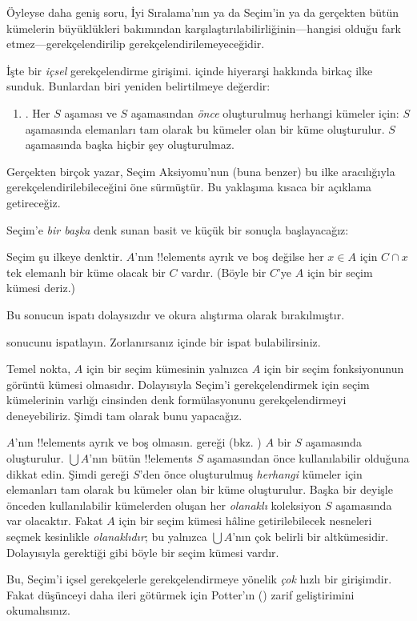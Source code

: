 


Öyleyse daha geniş soru, İyi Sıralama'nın ya da Seçim'in ya da gerçekten
bütün kümelerin büyüklükleri bakımından karşılaştırılabilirliğinin---hangisi
olduğu fark etmez---gerekçelendirilip gerekçelendirilemeyeceğidir.

İşte bir \emph{içsel} gerekçelendirme girişimi.
 içinde hiyerarşi hakkında birkaç ilke sunduk.
Bunlardan biri yeniden belirtilmeye değerdir:
\begin{enumerate}
	\item[] \stagesacc. Her $S$ aşaması ve $S$ aşamasından \emph{önce}
	oluşturulmuş herhangi kümeler için: $S$ aşamasında elemanları tam olarak
	bu kümeler olan bir küme oluşturulur. $S$ aşamasında başka hiçbir şey
	oluşturulmaz.
\end{enumerate}
Gerçekten birçok yazar, Seçim Aksiyomu'nun (buna benzer) bu ilke
aracılığıyla gerekçelendirilebileceğini öne sürmüştür. Bu yaklaşıma kısaca
bir açıklama getireceğiz.

Seçim'e \emph{bir başka} denk sunan basit ve küçük bir sonuçla başlayacağız:

\begin{thm}[$\ZF$ içinde]
Seçim şu ilkeye denktir. $A$'nın !!{element}s ayrık ve boş değilse her
$x\in A$ için $C\cap x$ tek elemanlı bir küme olacak bir $C$ vardır. (Böyle bir
$C$'ye $A$ için bir {seçim kümesi} deriz.)
\end{thm}

Bu sonucun ispatı dolaysızdır ve okura alıştırma olarak bırakılmıştır.

\begin{prob}
 sonucunu ispatlayın.
Zorlanırsanız \cite[pp.~242--3]{Potter2004} içinde bir ispat bulabilirsiniz.
\end{prob}

Temel nokta, $A$ için bir seçim kümesinin yalnızca $A$ için bir seçim
fonksiyonunun görüntü kümesi olmasıdır. Dolayısıyla Seçim'i gerekçelendirmek
için seçim kümelerinin varlığı cinsinden denk formülasyonunu
gerekçelendirmeyi deneyebiliriz. Şimdi tam olarak bunu yapacağız.

$A$'nın !!{element}s ayrık ve boş olmasın. \stageshier{} gereği
(bkz. ) $A$ bir $S$ aşamasında oluşturulur.
$\bigcup A$'nın bütün !!{element}s $S$ aşamasından önce kullanılabilir
olduğuna dikkat edin. Şimdi \stagesacc{} gereği $S$'den önce oluşturulmuş
\emph{herhangi} kümeler için elemanları tam olarak bu kümeler olan bir küme
oluşturulur. Başka bir deyişle önceden kullanılabilir kümelerden oluşan
her \emph{olanaklı} koleksiyon $S$ aşamasında var olacaktır. Fakat $A$ için
bir seçim kümesi hâline getirilebilecek nesneleri seçmek kesinlikle
\emph{olanaklıdır}; bu yalnızca $\bigcup A$'nın çok belirli bir altkümesidir.
Dolayısıyla gerektiği gibi böyle bir seçim kümesi vardır.

Bu, Seçim'i içsel gerekçelerle gerekçelendirmeye yönelik \emph{çok} hızlı
bir girişimdir. Fakat düşünceyi daha ileri götürmek için Potter'ın
(\citeyear[\S14.8]{Potter2004}) zarif geliştirimini okumalısınız.

